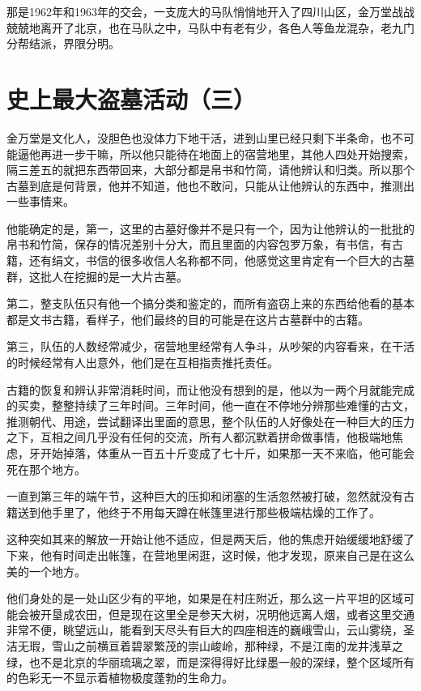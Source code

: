 那是1962年和1963年的交会，一支庞大的马队悄悄地开入了四川山区，金万堂战战兢兢地离开了北京，也在马队之中，马队中有老有少，各色人等鱼龙混杂，老九门分帮结派，界限分明。

\chapter{史上最大盗墓活动（三）}

金万堂是文化人，没胆色也没体力下地干活，进到山里已经只剩下半条命，也不可能逼他再进一步干嘛，所以他只能待在地面上的宿营地里，其他人四处开始搜索，隔三差五的就把东西带回来，大部分都是帛书和竹简，请他辨认和归类。所以那个古墓到底是何背景，他并不知道，他也不敢问，只能从让他辨认的东西中，推测出一些事情来。

他能确定的是，第一，这里的古墓好像并不是只有一个，因为让他辨认的一批批的帛书和竹简，保存的情况差别十分大，而且里面的内容包罗万象，有书信，有古籍，还有绢文，书信的很多收信人名称都不同，他感觉这里肯定有一个巨大的古墓群，这批人在挖掘的是一大片古墓。

第二，整支队伍只有他一个搞分类和鉴定的，而所有盗窃上来的东西给他看的基本都是文书古籍，看样子，他们最终的目的可能是在这片古墓群中的古籍。

第三，队伍的人数经常减少，宿营地里经常有人争斗，从吵架的内容看来，在干活的时候经常有人出意外，他们是在互相指责推托责任。

古籍的恢复和辨认非常消耗时间，而让他没有想到的是，他以为一两个月就能完成的买卖，整整持续了三年时间。三年时间，他一直在不停地分辨那些难懂的古文，推测朝代、用途，尝试翻译出里面的意思，整个队伍的人好像处在一种巨大的压力之下，互相之间几乎没有任何的交流，所有人都沉默着拼命做事情，他极端地焦虑，牙开始掉落，体重从一百五十斤变成了七十斤，如果那一天不来临，他可能会死在那个地方。

一直到第三年的端午节，这种巨大的压抑和闭塞的生活忽然被打破，忽然就没有古籍送到他手里了，他终于不用每天蹲在帐篷里进行那些极端枯燥的工作了。

这种突如其来的解放一开始让他不适应，但是两天后，他的焦虑开始缓缓地舒缓了下来，他有时间走出帐篷，在营地里闲逛，这时候，他才发现，原来自己是在这么美的一个地方。

他们身处的是一处山区少有的平地，如果是在村庄附近，那么这一片平坦的区域可能会被开垦成农田，但是现在这里全是参天大树，况明他远离人烟，或者这里交通非常不便，眺望远山，能看到天尽头有巨大的四座相连的巍峨雪山，云山雾绕，圣洁无瑕，雪山之前横亘着碧翠繁茂的崇山峻岭，那种绿，不是江南的龙井浅草之绿，也不是北京的华丽琉璃之翠，而是深得得好比绿墨一般的深绿，整个区域所有的色彩无一不显示着植物极度蓬勃的生命力。

